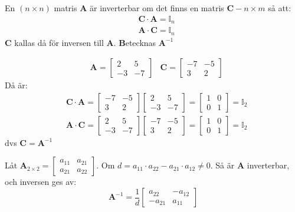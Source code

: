 \begin{Def}
    En $(n \times n)$ matris \textbf{A} är inverterbar om det finns en matris $\mathbf{C}-{n \times m}$ så att:
    \begin{align*}
    &\mathbf{C} \cdot \mathbf{A} = \mathbb{I}_n \\ &\mathbf{A} \cdot \mathbf{C} = \mathbb{I}_n
    \end{align*}
    \textbf{C} kallas då för inversen till \textbf{A}. \textbf{B}etecknas $\mathbf{A}^{-1}$
\end{Def}

\begin{Ex}
    \begin{align*}
    &\mathbf{A} = \begin{bmatrix} 2&5\\-3&-7 \end{bmatrix} &\mathbf{C} = \begin{bmatrix} -7&-5\\3&2 \end{bmatrix}
    \end{align*}
    Då är:
    \begin{align*}
    &\mathbf{C} \cdot \mathbf{A} = \begin{bmatrix} -7&-5\\3&2 \end{bmatrix} \begin{bmatrix} 2&5\\-3&-7 \end{bmatrix} = \begin{bmatrix} 1&0\\0&1 \end{bmatrix} = \mathbb{I}_2\\
    &\mathbf{A} \cdot \mathbf{C} = \begin{bmatrix} 2&5\\-3&-7 \end{bmatrix} \begin{bmatrix} -7&-5\\3&2 \end{bmatrix} = \begin{bmatrix} 1&0\\0&1 \end{bmatrix} = \mathbb{I}_2
    \end{align*}
    dvs $\mathbf{C} = \mathbf{A}^{-1}$
\end{Ex}
\newpage
\begin{sats}
    Låt $\mathbf{A}_{2\times 2} = \begin{bmatrix} a_{11}&a_{21}\\a_{21}&a_{22} \end{bmatrix}$. Om $d = a_{11} \cdot a_{22} - a_{21} \cdot a_{12} \neq 0$. Så är \textbf{A} inverterbar, och inversen ges av:
    \[
         \mathbf{A}^{-1} = \frac{1}{d}\begin{bmatrix} a_{22}&-a_{12}\\-a_{21}&a_{11} \end{bmatrix}
     \] 
\end{sats}
